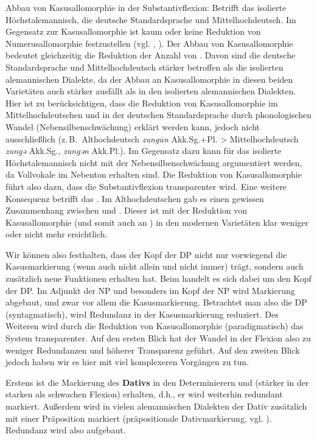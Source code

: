 \begin{longdescription}
\item[Abbau von Kasusallomorphie in der Substantivflexion:] Betrifft das isolierte Höchstalemannisch, die deutsche Standardsprache und Mittelhochdeutsch. Im Gegensatz zur Kasusallomorphie ist kaum oder keine Reduktion von Numerusallomorphie festzustellen (vgl. , ). Der Abbau von Kasusallomorphie bedeutet gleichzeitig die Reduktion der Anzahl von . Davon sind die deutsche Standardsprache und Mittelhochdeutsch stärker betroffen als die isolierten alemannischen Dialekte, da der Abbau an Kasusallomorphie in diesen beiden Varietäten auch stärker ausfällt als in den isolierten alemannischen Dialekten. Hier ist zu berücksichtigen, dass die Reduktion von Kasusallomorphie im Mittelhochdeutschen und in der deutschen Standardsprache durch phonologischen Wandel (Nebensilbenschwächung) erklärt werden kann, jedoch nicht ausschließlich (z.\,B.\ Althochdeutsch \textit{zung\=un} Akk.Sg.+Pl. > Mittelhochdeutsch \textit{zungə} Akk.Sg., \textit{zungən} Akk.Pl.). Im Gegensatz dazu kann für das isolierte Höchstalemannisch nicht mit der Nebensilbenschwächung argumentiert werden, da Vollvokale im Nebenton erhalten sind. Die Reduktion von Kasusallomorphie führt also dazu, dass die Substantivflexion transparenter wird. Eine weitere Konsequenz betrifft das . Im Althochdeutschen gab es einen gewissen Zusammenhang zwischen  und . Dieser ist mit der Reduktion von Kasusallomorphie (und somit auch an ) in den modernen Varietäten klar weniger oder nicht mehr ersichtlich.
\end{longdescription}

Wir können also festhalten, dass der Kopf der DP nicht nur vorwiegend die Kasusmarkierung (wenn auch nicht allein und nicht immer) trägt, sondern auch zusätzlich neue Funktionen erhalten hat. Beim  handelt es sich dabei um den Kopf der DP. Im Adjunkt der NP und besonders im Kopf der NP wird Markierung abgebaut, und zwar vor allem die Kasusmarkierung. Betrachtet man also die DP (syntagmatisch), wird Redundanz in der Kasusmarkierung reduziert. Des Weiteren wird durch die Reduktion von Kasusallomorphie (paradigmatisch) das System transparenter. Auf den ersten Blick hat der Wandel in der Flexion also zu weniger Redundanzen und höherer Transparenz geführt. Auf den zweiten Blick jedoch haben wir es hier mit viel komplexeren Vorgängen zu tun.

Erstens ist die Markierung des \textbf{Dativs} in den Determinierern und  (stärker in der starken als schwachen Flexion) erhalten, d.h., er wird weiterhin redundant markiert. Außerdem wird in vielen alemannischen Dialekten der Dativ zusätzlich mit einer Präposition markiert (präpositionale Dativmarkierung, vgl. \citealt{Seiler2003}). Redundanz wird also aufgebaut.

